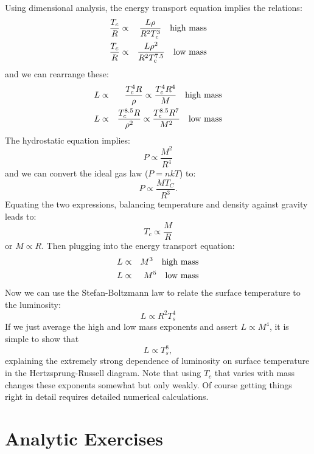 \begin{enumerate}
\begin{answer}
Using dimensional analysis, the energy transport equation implies the
relations: 
\begin{eqnarray}
\frac{T_c}{R} &\propto& \frac{L \rho}{R^2T_c^3} \mathrm{\quad high~mass}\cr
\frac{T_c}{R} &\propto& \frac{L \rho^2}{R^2T_c^{7.5}} \mathrm{\quad low~mass}
\end{eqnarray}
and we can rearrange these:
\begin{eqnarray}
  L &\propto& \frac{T_c^4 R}{\rho} \propto \frac{T_c^4
  R^4}{M} \mathrm{\quad high~mass} \cr
  L &\propto& \frac{T_c^{8.5} R}{\rho^2} \propto \frac{T_c^{8.5}
  R^7}{M^2} \mathrm{\quad low~mass}
\end{eqnarray}
The hydrostatic equation implies:
\begin{equation}
P \propto \frac{M^2}{R^4}
\end{equation}
and we can convert the ideal gas law ($P = nkT$) to:
\begin{equation}
P \propto \frac{MT_C}{R^3}.
\end{equation}
Equating the two expressions, balancing temperature and density
against gravity leads to:
\begin{equation}
T_c \propto \frac{M}{R}
\end{equation}
or $M\propto R$. Then plugging into the energy transport equation:
\begin{eqnarray}
  L &\propto& M^3 \mathrm{\quad high~mass} \cr
  L &\propto& M^5 \mathrm{\quad low~mass}
\end{eqnarray}
Now we can use the Stefan-Boltzmann law to relate the surface
temperature to the luminosity:
\begin{equation}
L \propto R^2 T_s^4
\end{equation}
If we just average the high and low mass exponents and assert
$L\propto M^4$, it is simple to show that
\begin{equation}
L \propto T_s^8,
\end{equation}
explaining the extremely strong dependence of luminosity on surface
temperature in the Hertzsprung-Russell diagram. Note that using $T_c$
that varies with mass changes these exponents somewhat but only
weakly. Of course getting things right in detail requires detailed
numerical calculations.
\end{answer}

\end{enumerate} 

\section{Analytic Exercises}

